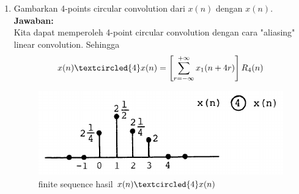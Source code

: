 \documentclass[12pt,a4paper]{article}
\begin{document}
\begin{enumerate}
\begin{enumerate}
			\item Gambarkan 4-points circular convolution dari $ x(n) $ dengan $ x(n) $.\\
			\textbf{Jawaban:}\\
			Kita dapat memperoleh 4-point circular convolution dengan cara "aliasing" linear convolution. Sehingga \[ x(n) \textcircled{4} x(n) = \left[ \sum_{r=-\infty}^{+\infty} x_1(n+4r) \right] R_4(n) \]
			
			\begin{figure}[H]
				\centering
				\includegraphics[width=0.6\linewidth]{img/img03}
				\caption{finite sequence hasil $ x(n) \textcircled{4} x(n) $}
				\label{fig:img03}
			\end{figure}
		\end{enumerate}
	\end{enumerate}
\end{document}
